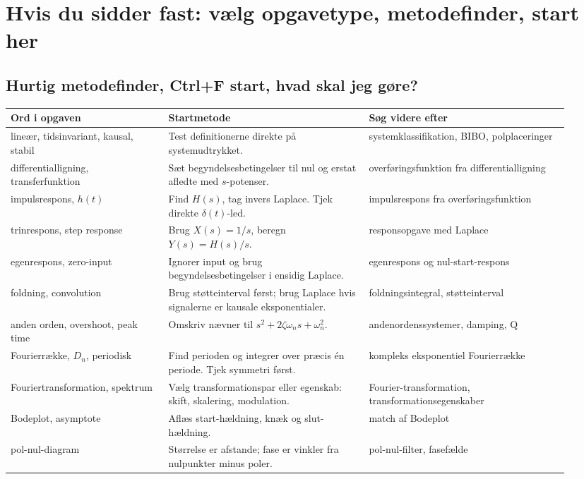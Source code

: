\section{Hvis du sidder fast: vælg opgavetype, metodefinder, start her}

\subsection{Hurtig metodefinder, Ctrl+F start, hvad skal jeg gøre?}

\begin{tabular}{p{0.26\linewidth}p{0.33\linewidth}p{0.33\linewidth}}
\toprule
Ord i opgaven & Startmetode & Søg videre efter \\
\midrule
lineær, tidsinvariant, kausal, stabil & Test definitionerne direkte på systemudtrykket. & systemklassifikation, BIBO, polplaceringer \\
differentialligning, transferfunktion & Sæt begyndelsesbetingelser til nul og erstat afledte med \(s\)-potenser. & overføringsfunktion fra differentialligning \\
impulsrespons, \(h(t)\) & Find \(H(s)\), tag invers Laplace. Tjek direkte \(\delta(t)\)-led. & impulsrespons fra overføringsfunktion \\
trinrespons, step response & Brug \(X(s)=1/s\), beregn \(Y(s)=H(s)/s\). & responsopgave med Laplace \\
egenrespons, zero-input & Ignorer input og brug begyndelsesbetingelser i ensidig Laplace. & egenrespons og nul-start-respons \\
foldning, convolution & Brug støtteinterval først; brug Laplace hvis signalerne er kausale eksponentialer. & foldningsintegral, støtteinterval \\
anden orden, overshoot, peak time & Omskriv nævner til \(s^2+2\zeta\omega_ns+\omega_n^2\). & andenordenssystemer, damping, Q \\
Fourierrække, \(D_n\), periodisk & Find perioden og integrer over præcis én periode. Tjek symmetri først. & kompleks eksponentiel Fourierrække \\
Fouriertransformation, spektrum & Vælg transformationspar eller egenskab: skift, skalering, modulation. & Fourier-transformation, transformationsegenskaber \\
Bodeplot, asymptote & Aflæs start-hældning, knæk og slut-hældning. & match af Bodeplot \\
pol-nul-diagram & Størrelse er afstande; fase er vinkler fra nulpunkter minus poler. & pol-nul-filter, fasefælde \\

\end{tabular}

